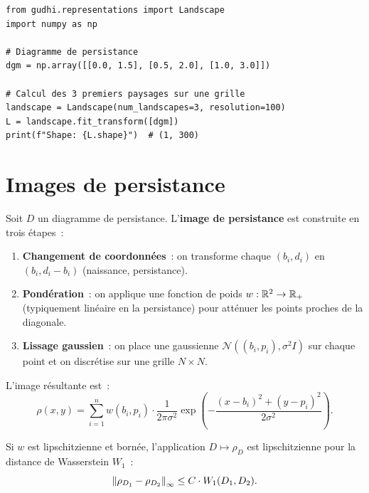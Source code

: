 \begin{verbatim}
from gudhi.representations import Landscape
import numpy as np

# Diagramme de persistance
dgm = np.array([[0.0, 1.5], [0.5, 2.0], [1.0, 3.0]])

# Calcul des 3 premiers paysages sur une grille
landscape = Landscape(num_landscapes=3, resolution=100)
L = landscape.fit_transform([dgm])
print(f"Shape: {L.shape}")  # (1, 300)
\end{verbatim}

\section{Images de persistance}
\label{sec:images}

\begin{definition}
Soit $D$ un diagramme de persistance. L'\textbf{image de persistance}
est construite en trois \'etapes~:
\begin{enumerate}
  \item \textbf{Changement de coordonn\'ees}~: on transforme chaque
        $(b_i, d_i)$ en $(b_i, d_i - b_i)$ (naissance, persistance).
  \item \textbf{Pond\'eration}~: on applique une fonction de poids
        $w : \mathbb{R}^2 \to \mathbb{R}_+$ (typiquement lin\'eaire en la persistance)
        pour att\'enuer les points proches de la diagonale.
  \item \textbf{Lissage gaussien}~: on place une gaussienne
        $\mathcal{N}((b_i, p_i), \sigma^2 I)$ sur chaque point et
        on discr\'etise sur une grille $N \times N$.
\end{enumerate}
L'image r\'esultante est~:
\[
  \rho(x, y) = \sum_{i=1}^n w(b_i, p_i) \cdot
  \frac{1}{2\pi\sigma^2}
  \exp\!\left(-\frac{(x - b_i)^2 + (y - p_i)^2}{2\sigma^2}\right).
\]
\end{definition}

\begin{theoreme}
Si $w$ est lipschitzienne et born\'ee, l'application
$D \mapsto \rho_D$ est lipschitzienne pour la distance de Wasserstein
$W_1$~:
\[
  \left\| \rho_{D_1} - \rho_{D_2} \right\|_\infty \leq C \cdot W_1(D_1, D_2).
\]
\end{theoreme}

